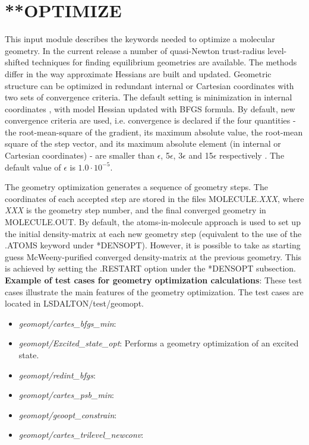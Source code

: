 \section{**OPTIMIZE}\label{sec:optimize}
This input module describes the keywords needed to optimize a molecular geometry.
In the current release a number of quasi-Newton trust-radius level-shifted techniques for finding 
equilibrium geometries are available. The methods differ in the way approximate Hessians are 
built and updated. Geometric structure can be optimized in redundant internal or 
Cartesian coordinates with two sets of convergence criteria. The default setting is minimization 
in internal coordinates \cite{DaltonOpt}, with model Hessian \cite{ModelHess} updated with BFGS formula. 
By default, new convergence criteria are used, i.e. convergence is declared if  the four quantities - 
the root-mean-square of the gradient, its maximum absolute value, the root-mean square of the step
vector, and its maximum absolute element (in internal or Cartesian coordinates) - 
are smaller than $\epsilon$, 5$\epsilon$, 3$\epsilon$ and 15$\epsilon$ respectively \cite{NewConv}.
The default value of $\epsilon$ is $1.0\cdot 10^{-5}$.

The geometry optimization generates a sequence of geometry steps. The coordinates of each 
accepted step are stored in the files MOLECULE.\emph{XXX}, where \emph{XXX} 
is the geometry step number, and the final converged geometry in MOLECULE.OUT.
By default, the atoms-in-molecule approach is used to set up the initial density-matrix at each new
geometry step (equivalent to the use of the .ATOMS keyword under *DENSOPT).
However, it is possible to take as starting guess McWeeny-purified converged
density-matrix at the previous geometry. This is achieved by setting the .RESTART option under
the *DENSOPT subsection.
\newline
\vspace{1 cm}
\noindent
\textbf{Example of test cases for geometry optimization calculations}: \newline
These test cases illustrate the main features of the geometry optimization. The test cases are located in LSDALTON/test/geomopt.
\begin{itemize}
\item
\textit{geomopt/cartes\_bfgs\_min}:
\item
\textit{geomopt/Excited\_state\_opt}: Performs a geometry optimization of an excited state. 
\item
\textit{geomopt/redint\_bfgs}:
\item
\textit{geomopt/cartes\_psb\_min}:
\item
\textit{geomopt/geoopt\_constrain}:
\item
\textit{geomopt/cartes\_trilevel\_newconv}: 
\end{itemize}

